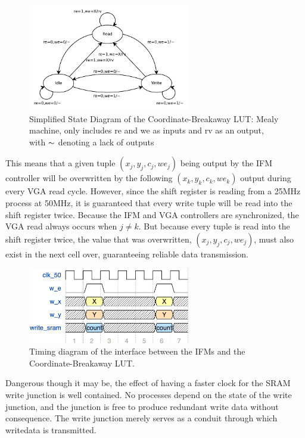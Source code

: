 \documentclass{article}
\begin{document}
\begin{figure}[H]
  \centering
    \includegraphics[width=200pt]{state_diagrams/clut.pdf}
  \caption{Simplified State Diagram of the Coordinate-Breakaway LUT:
    Mealy machine, only includes re and we as inputs and rv as an
    output, with $\thicksim$ denoting a lack of outputs}
\end{figure}

This means that a given tuple $(x_j, y_j, c_j, we_j)$ being output by the IFM controller will be overwritten by the 
following $(x_k, y_k, c_k, we_k)$ output during every VGA read cycle. However, since the shift register is reading from a 25MHz process at 50MHz, it is guaranteed that every write tuple will be read into the shift register twice. Because the IFM
and VGA controllers are synchronized, the VGA read always occurs when $j \neq k$. But because every tuple is read into the
shift register twice, the value that was overwritten, $(x_j, y_j, c_j, we_j)$, must also exist in the next cell over, 
guaranteeing reliable data transmission.

\begin{figure}[H]
  \centering
    \includegraphics[width=200pt]{timing_diagrams/ifm_clut.pdf}
  \caption{Timing diagram of the interface between the IFMs and the Coordinate-Breakaway LUT.}
\end{figure}

Dangerous though it may be, the effect of having a faster clock for the SRAM write junction is well contained.
No processes depend on the state of the write junction, and the junction is free to produce redundant write data
without consequence. The write junction merely serves as a conduit through which writedata is transmitted.
\end{document}
